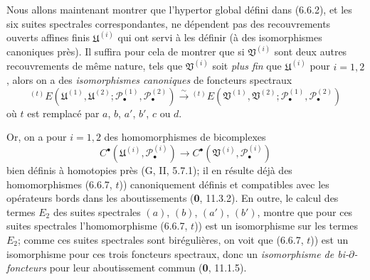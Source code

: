 \begin{env}[6.6.7]
Nous allons maintenant montrer que l'hypertor global défini dans (6.6.2), et
les six suites spectrales correspondantes, ne dépendent pas des recouvrements
ouverts affines finis $\mathfrak U^{(i)}$ qui ont servi à les définir (à des
isomorphismes canoniques près). Il suffira pour cela de montrer que si
$\mathfrak V^{(i)}$ sont deux autres recouvrements de même nature, tels que
$\mathfrak V^{(i)}$ soit \emph{plus fin} que $\mathfrak U^{(i)}$ pour
$i=1,2$, alors on a des \emph{isomorphismes canoniques} de foncteurs spectraux
\[
  {}^{(t)}E
  (\mathfrak U^{(1)},\mathfrak U^{(2)};
   \mathscr P_\bullet^{(1)},\mathscr P_\bullet^{(2)})
  \xrightarrow{\sim}
  {}^{(t)}E
  (\mathfrak V^{(1)},\mathfrak V^{(2)};
   \mathscr P_\bullet^{(1)},\mathscr P_\bullet^{(2)})
  \tag{6.6.7, $t$)}\label{III.6.6.7.t.fr}
\]
où $t$ est remplacé par $a$, $b$, $a'$, $b'$, $c$ ou $d$.

Or, on a pour $i=1,2$ des homomorphismes de bicomplexes
\[
  C^\bullet(\mathfrak U^{(i)},\mathscr P_\bullet^{(i)})
  \longrightarrow
  C^\bullet(\mathfrak V^{(i)},\mathscr P_\bullet^{(i)})
\]
bien définis à homotopies près (G, II, 5.7.1); il en résulte déjà des
homomorphismes (6.6.7, $t$)) canoniquement définis et compatibles avec les
opérateurs bords dans les aboutissements (\textbf{0}, 11.3.2). En outre,
le calcul des termes $E_2$ des suites spectrales $(a)$, $(b)$, $(a')$, $(b')$,
montre que pour ces suites spectrales l'homomorphisme (6.6.7, $t$)) est un
isomorphisme sur les termes $E_2$; comme ces suites spectrales sont
birégulières, on voit que (6.6.7, $t$)) est un isomorphisme pour ces trois
foncteurs spectraux, donc un \emph{isomorphisme de bi-$\partial$-foncteurs}
pour leur aboutissement commun (\textbf{0}, 11.1.5).


\end{env}
